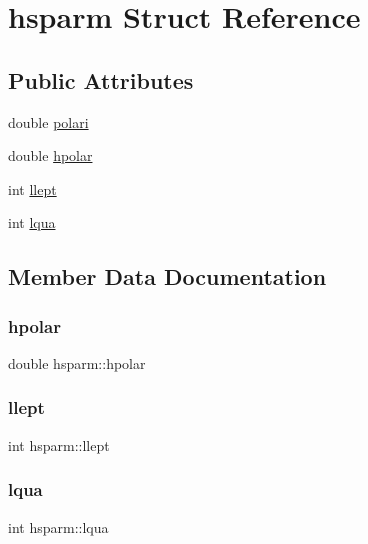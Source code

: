 \hypertarget{structhsparm}{}\section{hsparm Struct Reference}
\label{structhsparm}
\subsection*{Public Attributes}
\begin{DoxyCompactItemize}
\item 
double \hyperlink{structhsparm_ab9e3d5d5c31640579cad357b9437f321}{polari}
\item 
double \hyperlink{structhsparm_ae2605751d58239b730b55da971005638}{hpolar}
\item 
int \hyperlink{structhsparm_a612d27701ff8b3392ea4958516a6fa61}{llept}
\item 
int \hyperlink{structhsparm_ad56328f095f6a4ca162524c7fbf62da6}{lqua}
\end{DoxyCompactItemize}


\subsection{Member Data Documentation}
\mbox{\label{structhsparm_ae2605751d58239b730b55da971005638}} 
\subsubsection{\texorpdfstring{hpolar}{hpolar}}
{\footnotesize\ttfamily double hsparm\+::hpolar}

\mbox{\label{structhsparm_a612d27701ff8b3392ea4958516a6fa61}} 
\subsubsection{\texorpdfstring{llept}{llept}}
{\footnotesize\ttfamily int hsparm\+::llept}

\mbox{\label{structhsparm_ad56328f095f6a4ca162524c7fbf62da6}} 
\subsubsection{\texorpdfstring{lqua}{lqua}}
{\footnotesize\ttfamily int hsparm\+::lqua}

